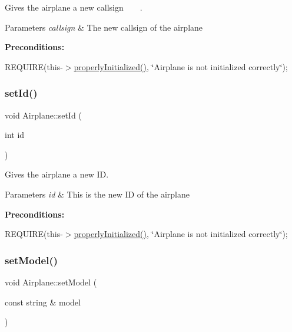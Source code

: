 Gives the airplane a new callsign ~\newline
 ~\newline
. 


\begin{DoxyParams}{Parameters}
{\em callsign} & The new callsign of the airplane\\
\hline
\end{DoxyParams}
{\bfseries Preconditions\+:}
\begin{DoxyItemize}
\item R\+E\+Q\+U\+I\+RE(this-\/$>$\mbox{\hyperlink{class_airplane_a6f80df8f692cc8d67d292c1e9f26d59e}{properly\+Initialized()}}, \char`\"{}\+Airplane is not initialized correctly\char`\"{}); 
\end{DoxyItemize}\mbox{\label{class_airplane_ac71484f422e952d4cfe94d89b302dbc4}} 
\subsubsection{\texorpdfstring{set\+Id()}{setId()}}
{\footnotesize\ttfamily void Airplane\+::set\+Id (\begin{DoxyParamCaption}\item[{int}]{id }\end{DoxyParamCaption})}



Gives the airplane a new ID. 


\begin{DoxyParams}{Parameters}
{\em id} & This is the new ID of the airplane\\
\hline
\end{DoxyParams}
{\bfseries Preconditions\+:}
\begin{DoxyItemize}
\item R\+E\+Q\+U\+I\+RE(this-\/$>$\mbox{\hyperlink{class_airplane_a6f80df8f692cc8d67d292c1e9f26d59e}{properly\+Initialized()}}, \char`\"{}\+Airplane is not initialized correctly\char`\"{}); 
\end{DoxyItemize}\mbox{\label{class_airplane_aaeb19ae361b046ce543ad687aea63123}} 
\subsubsection{\texorpdfstring{set\+Model()}{setModel()}}
{\footnotesize\ttfamily void Airplane\+::set\+Model (\begin{DoxyParamCaption}\item[{const string \&}]{model }\end{DoxyParamCaption})}



